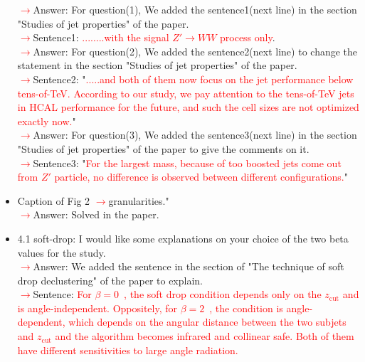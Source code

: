 \documentclass[final,1p,11pt]{elsarticle}
\begin{document}
\begin{itemize}
 \textcolor{red}{$\rightarrow$}Answer: For question(1), We added the sentence1(next line) in the section "Studies of jet properties" of the paper.\\
 \textcolor{red}{$\rightarrow$}Sentence1: \textcolor{red}{........with the signal $Z'\rightarrow WW$ process only}.\\
  \textcolor{red}{$\rightarrow$}Answer: For question(2), We added the sentence2(next line) to change the statement in the section "Studies of jet properties" of the paper.\\
 \textcolor{red}{$\rightarrow$}Sentence2: "\textcolor{red}{.....and both of them now focus on the jet performance below tens-of-TeV. According to our study, we pay attention to the tens-of-TeV jets in HCAL performance for the future, and such the cell sizes are not optimized exactly now.}"\\
   \textcolor{red}{$\rightarrow$}Answer: For question(3), We added the sentence3(next line) in the section "Studies of jet properties" of the paper to give the comments on it.\\
 \textcolor{red}{$\rightarrow$}Sentence3: "\textcolor{red}{For the largest mass, because of too boosted jets come out from $Z'$ particle, no difference is observed between different configurations.}"\\
\item Caption of Fig 2 \textcolor{red}{$\rightarrow$}granularities."\\
 \textcolor{red}{$\rightarrow$}Answer: Solved in the paper.\\
\item 4.1 soft-drop: I would like some explanations on your choice of the two beta values for the study.\\
 \textcolor{red}{$\rightarrow$}Answer: We added the sentence in the section of "The technique of soft drop declustering" of the paper to explain.\\
 \textcolor{red}{$\rightarrow$}Sentence: \textcolor{red}{For $\beta=0$~\cite{CMS:2017wyc,Tripathee:2017ybi}, the soft drop condition 
depends only on the $z_\mathrm{cut}$ and is angle-independent. Oppositely, for $\beta=2$~\cite{Aaboud:2017qwh}, the condition is angle-dependent, which depends on the angular distance between the two subjets and $z_\mathrm{cut}$ and the algorithm becomes infrared and collinear safe. Both of them have different sensitivities to large angle radiation.}\\

\end{itemize}
\end{document}
